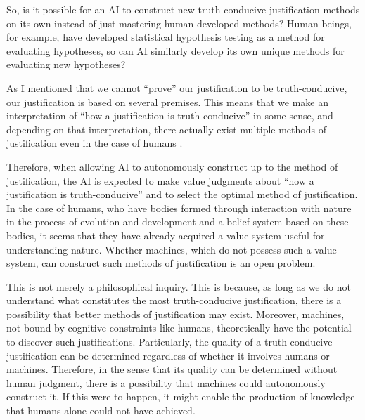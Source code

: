 So, is it possible for an AI to construct new truth-conducive justification methods on its own instead of just mastering human developed methods? Human beings, for example, have developed statistical hypothesis testing as a method for evaluating hypotheses, so can AI similarly develop its own unique methods for evaluating new hypotheses?

As I mentioned that we cannot ``prove'' our justification to be truth-conducive, our justification is based on several premises. This means that we make an interpretation of ``how a justification is truth-conducive'' in some sense, and depending on that interpretation, there actually exist multiple methods of justification even in the case of humans \cite{otsuka2022thinking}.

Therefore, when allowing AI to autonomously construct up to the method of justification, the AI is expected to make value judgments about ``how a justification is truth-conducive'' and to select the optimal method of justification. In the case of humans, who have bodies formed through interaction with nature in the process of evolution and development and a belief system based on these bodies, it seems that they have already acquired a value system useful for understanding nature. Whether machines, which do not possess such a value system, can construct such methods of justification is an open problem.

This is not merely a philosophical inquiry. This is because, as long as we do not understand what constitutes the most truth-conducive justification, there is a possibility that better methods of justification may exist. Moreover, machines, not bound by cognitive constraints like humans, theoretically have the potential to discover such justifications. Particularly, the quality of a truth-conducive justification can be determined regardless of whether it involves humans or machines. Therefore, in the sense that its quality can be determined without human judgment, there is a possibility that machines could autonomously construct it. If this were to happen, it might enable the production of knowledge that humans alone could not have achieved.

